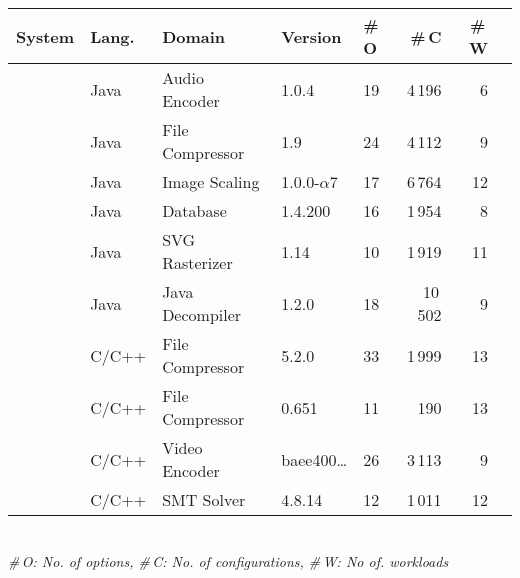 \begin{tabular}{p{1.1cm}p{0.6cm}p{1.9cm}p{0.99cm}p{0.2cm}rrr}
		\toprule
		\textbf{System} & \textbf{Lang.} & \textbf{Domain} & \textbf{Version} & \textbf{\#\,O} & \textbf{\#\,C} & \textbf{\#\,W}  \\
		
		 
		\midrule
		\jumper & Java & Audio Encoder & 1.0.4 & 19 & 4\,196 & 6   \\
		
		\kanzi &Java  & File Compressor & 1.9 & 24 & 4\,112 & 9 \\
			
		\dconvert & Java & Image Scaling & 1.0.0-$\alpha$7 & 17 & 6\,764 & 12  \\
				
		\htwo & Java & Database & 1.4.200 & 16 & 1\,954  & 8  \\
		
		\batik & Java & SVG Rasterizer & 1.14 & 10 & 1\,919 &  11  \\
		
		\jadx & Java & Java Decompiler & 1.2.0 & 18 & 10\,502 & 9  \\
		
		\midrule
		
		 \rowcolor{black!10!white}\xz & C/C++ & File Compressor & 5.2.0 & 33 & 1\,999 & 13  \\
		\lrzip & C/C++ & File Compressor & 0.651 & 11 & 190 & 13  \\
		
		\xzwo & C/C++ & Video Encoder & baee400\ldots & 26 & 3\,113 & 9  \\
		\zdrei & C/C++ & SMT Solver & 4.8.14 & 12 & 1\,011 & 12  \\
		
\bottomrule

\end{tabular}\\
{\centering\vspace{1mm}\textit{\#\,O: No. of options, \#\,C: No. of configurations, \#\,W: No of. workloads}}

